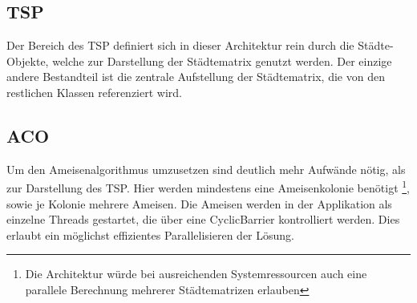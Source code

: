 {	\subsection{TSP}
	Der Bereich des TSP definiert sich in dieser Architektur rein durch die Städte-Objekte, welche zur Darstellung der Städtematrix genutzt werden. Der einzige andere Bestandteil ist die zentrale Aufstellung der Städtematrix, die von den restlichen Klassen referenziert wird.
	
	\subsection{ACO}
	Um den Ameisenalgorithmus umzusetzen sind deutlich mehr Aufwände nötig, als zur Darstellung des TSP. Hier werden mindestens eine Ameisenkolonie benötigt \footnote{Die Architektur würde bei ausreichenden Systemressourcen auch eine parallele Berechnung mehrerer Städtematrizen erlauben},
	sowie je Kolonie mehrere Ameisen.
	\newline
	Die Ameisen werden in der Applikation als einzelne Threads gestartet, die über eine CyclicBarrier kontrolliert werden. Dies erlaubt ein möglichst effizientes Parallelisieren der Lösung.
	
	
}